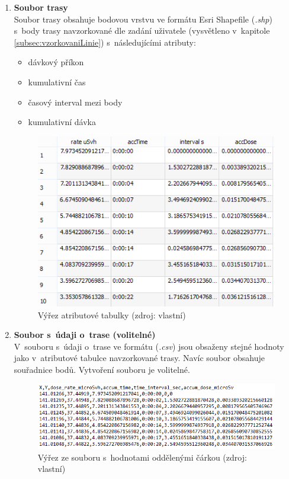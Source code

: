 \begin{enumerate}
	\item \textbf{Soubor trasy} \\
	Soubor trasy obsahuje bodovou vrstvu ve formátu Esri Shapefile (\textit{.shp}) s~body trasy navzorkované dle zadání uživatele (vysvětleno v~kapitole \ref{subsec:vzorkovaniLinie}) s~následujícími atributy:
		\begin{itemize}
			\item dávkový příkon
			\item kumulativní čas
			\item časový interval mezi body
			\item kumulativní dávka
		\end{itemize}
			\begin{figure}[H]
    			\centering
      			\includegraphics[scale=1]{./pictures/atributova_tabulka.png}
      				\caption[Výřez atributové tabulky]{Výřez atributové tabulky (zdroj: vlastní)}
     				\label{fig:atributova_tabulka}
  			\end{figure}
  	
  	\item \textbf{Soubor s~údaji o~trase (volitelné)} \\
  	V~souboru s~údaji o~trase ve formátu  (\textit{.csv}) jsou obsaženy stejné hodnoty jako v~atributové tabulce navzorkované trasy. Navíc soubor obsahuje souřadnice bodů. Vytvoření souboru je volitelné. 
  			\begin{figure}[H]
    			\centering
      			\includegraphics[scale=0.8]{./pictures/csv.png}
      				\caption[Výřez ze souboru s~hodnotami oddělenými čárkou]{Výřez ze souboru s~hodnotami oddělenými čárkou (zdroj: vlastní)}
     				\label{fig:csv}
  			\end{figure}	
\end{enumerate}

